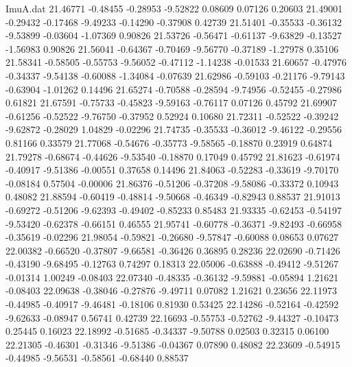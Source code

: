 \begin{filecontents}{ImuA.dat}
  21.46771   -0.48455   -0.28953   -9.52822    0.08609    0.07126    0.20603
  21.49001   -0.29432   -0.17468   -9.49233   -0.14290   -0.37908    0.42739
  21.51401   -0.35533   -0.36132   -9.53899   -0.03604   -1.07369    0.90826
  21.53726   -0.56471   -0.61137   -9.63829   -0.13527   -1.56983    0.90826
  21.56041   -0.64367   -0.70469   -9.56770   -0.37189   -1.27978    0.35106
  21.58341   -0.58505   -0.55753   -9.56052   -0.47112   -1.14238   -0.01533
  21.60657   -0.47976   -0.34337   -9.54138   -0.60088   -1.34084   -0.07639
  21.62986   -0.59103   -0.21176   -9.79143   -0.63904   -1.01262    0.14496
  21.65274   -0.70588   -0.28594   -9.74956   -0.52455   -0.27986    0.61821
  21.67591   -0.75733   -0.45823   -9.59163   -0.76117    0.07126    0.45792
  21.69907   -0.61256   -0.52522   -9.76750   -0.37952    0.52924    0.10680
  21.72311   -0.52522   -0.39242   -9.62872   -0.28029    1.04829   -0.02296
  21.74735   -0.35533   -0.36012   -9.46122   -0.29556    0.81166    0.33579
  21.77068   -0.54676   -0.35773   -9.58565   -0.18870    0.23919    0.64874
  21.79278   -0.68674   -0.44626   -9.53540   -0.18870    0.17049    0.45792
  21.81623   -0.61974   -0.40917   -9.51386   -0.00551    0.37658    0.14496
  21.84063   -0.52283   -0.33619   -9.70170   -0.08184    0.57504   -0.00006
  21.86376   -0.51206   -0.37208   -9.58086   -0.33372    0.10943    0.48082
  21.88594   -0.60419   -0.48814   -9.50668   -0.46349   -0.82943    0.88537
  21.91013   -0.69272   -0.51206   -9.62393   -0.49402   -0.85233    0.85483
  21.93335   -0.62453   -0.54197   -9.53420   -0.62378   -0.66151    0.46555
  21.95741   -0.60778   -0.36371   -9.82493   -0.66958   -0.35619   -0.02296
  21.98054   -0.59821   -0.26680   -9.57847   -0.60088    0.08653    0.07627
  22.00382   -0.66520   -0.37807   -9.66581   -0.36426    0.36895    0.28236
  22.02690   -0.71426   -0.43190   -9.68495   -0.12763    0.74297    0.18313
  22.05006   -0.63888   -0.49412   -9.51267   -0.01314    1.00249   -0.08403
  22.07340   -0.48335   -0.36132   -9.59881   -0.05894    1.21621   -0.08403
  22.09638   -0.38046   -0.27876   -9.49711    0.07082    1.21621    0.23656
  22.11973   -0.44985   -0.40917   -9.46481   -0.18106    0.81930    0.53425
  22.14286   -0.52164   -0.42592   -9.62633   -0.08947    0.56741    0.42739
  22.16693   -0.55753   -0.52762   -9.44327   -0.10473    0.25445    0.16023
  22.18992   -0.51685   -0.34337   -9.50788    0.02503    0.32315    0.06100
  22.21305   -0.46301   -0.31346   -9.51386   -0.04367    0.07890    0.48082
  22.23609   -0.54915   -0.44985   -9.56531   -0.58561   -0.68440    0.88537

\end{filecontents}
